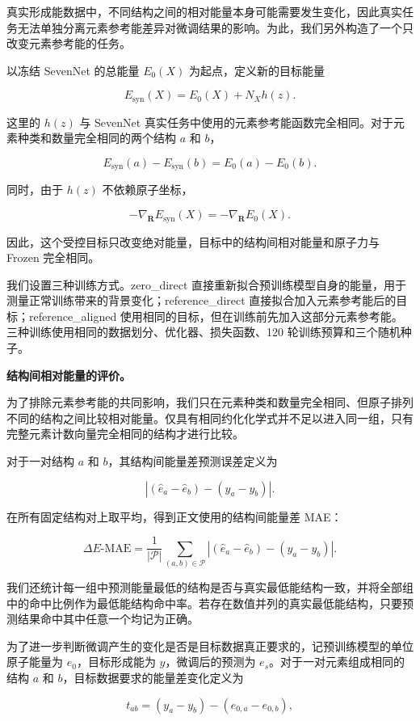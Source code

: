 \documentclass[UTF8,a4paper,12pt,fontset=fandol]{ctexart}
\begin{document}
真实形成能数据中，不同结构之间的相对能量本身可能需要发生变化，因此真实任务无法单独分离元素参考能差异对微调结果的影响。为此，我们另外构造了一个只改变元素参考能的任务。

以冻结 SevenNet 的总能量 \(E_0(X)\) 为起点，定义新的目标能量

\[
E_{\mathrm{syn}}(X)
=
E_0(X)+N_Xh(z).
\]

这里的 \(h(z)\) 与 SevenNet 真实任务中使用的元素参考能函数完全相同。对于元素种类和数量完全相同的两个结构 \(a\) 和 \(b\)，

\[
E_{\mathrm{syn}}(a)-E_{\mathrm{syn}}(b)
=
E_0(a)-E_0(b).
\]

同时，由于 \(h(z)\) 不依赖原子坐标，

\[
-\nabla_{\mathbf R}E_{\mathrm{syn}}(X)
=
-\nabla_{\mathbf R}E_0(X).
\]

因此，这个受控目标只改变绝对能量，目标中的结构间相对能量和原子力与 Frozen 完全相同。

我们设置三种训练方式。zero\_direct 直接重新拟合预训练模型自身的能量，用于测量正常训练带来的背景变化；reference\_direct 直接拟合加入元素参考能后的目标；reference\_aligned 使用相同的目标，但在训练前先加入这部分元素参考能。三种训练使用相同的数据划分、优化器、损失函数、120 轮训练预算和三个随机种子。


\textbf{结构间相对能量的评价。}

为了排除元素参考能的共同影响，我们只在元素种类和数量完全相同、但原子排列不同的结构之间比较相对能量。仅具有相同约化化学式并不足以进入同一组，只有完整元素计数向量完全相同的结构才进行比较。

对于一对结构 \(a\) 和 \(b\)，其结构间能量差预测误差定义为

\[
\left|
(\hat e_a-\hat e_b)
-
(y_a-y_b)
\right|.
\]

在所有固定结构对上取平均，得到正文使用的结构间能量差 MAE：

\[
\Delta E\text{-MAE}
=
\frac{1}{|\mathcal P|}
\sum_{(a,b)\in\mathcal P}
\left|
(\hat e_a-\hat e_b)
-
(y_a-y_b)
\right|.
\]

我们还统计每一组中预测能量最低的结构是否与真实最低能结构一致，并将全部组中的命中比例作为最低能结构命中率。若存在数值并列的真实最低能结构，只要预测结果命中其中任意一个均记为正确。

为了进一步判断微调产生的变化是否是目标数据真正要求的，记预训练模型的单位原子能量为 \(e_0\)，目标形成能为 \(y\)，微调后的预测为 \(e_s\)。对于一对元素组成相同的结构 \(a\) 和 \(b\)，目标数据要求的能量差变化定义为

\[
t_{ab}
=
(y_a-y_b)
-
(e_{0,a}-e_{0,b}),
\]
\end{document}
